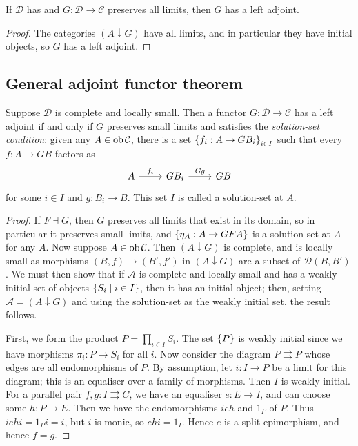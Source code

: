 \begin{proposition}
    If \( \mathcal D \) has and \( G : \mathcal D \to \mathcal C \) preserves all limits, then \( G \) has a left adjoint.
\end{proposition}
\begin{proof}
    The categories \( (A \downarrow G) \) have all limits, and in particular they have initial objects, so \( G \) has a left adjoint.
\end{proof}

\subsection{General adjoint functor theorem}
\begin{theorem}
    Suppose \( \mathcal D \) is complete and locally small.
    Then a functor \( G : \mathcal D \to \mathcal C \) has a left adjoint if and only if \( G \) preserves small limits and satisfies the \emph{solution-set condition}: given any \( A \in \operatorname{ob} \mathcal C \), there is a set \( \qty{f_i : A \to GB_i}_{i \in I} \) such that every \( f : A \to GB \) factors as
\[\begin{tikzcd}
	A & {GB_i} & GB
	\arrow["{f_i}", from=1-1, to=1-2]
	\arrow["Gg", from=1-2, to=1-3]
\end{tikzcd}\]
    for some \( i \in I \) and \( g : B_i \to B \).
    This set \( I \) is called a solution-set at \( A \).
\end{theorem}
\begin{proof}
    If \( F \dashv G \), then \( G \) preserves all limits that exist in its domain, so in particular it preserves small limits, and \( \qty{\eta_A : A \to GFA} \) is a solution-set at \( A \) for any \( A \).
    Now suppose \( A \in \operatorname{ob} \mathcal C \).
    Then \( (A \downarrow G) \) is complete, and is locally small as morphisms \( (B, f) \to (B', f') \) in \( (A \downarrow G) \) are a subset of \( \mathcal D(B, B') \).
    We must then show that if \( \mathcal A \) is complete and locally small and has a weakly initial set of objects \( \qty{S_i \mid i \in I} \), then it has an initial object; then, setting \( \mathcal A = (A \downarrow G) \) and using the solution-set as the weakly initial set, the result follows.

    First, we form the product \( P = \prod_{i \in I} S_i \).
    The set \( \qty{P} \) is weakly initial since we have morphisms \( \pi_i : P \to S_i \) for all \( i \).
    Now consider the diagram \( P \rightrightarrows P \) whose edges are all endomorphisms of \( P \).
    By assumption, let \( i : I \to P \) be a limit for this diagram; this is an equaliser over a family of morphisms.
    Then \( I \) is weakly initial.
    For a parallel pair \( f, g : I \rightrightarrows C \), we have an equaliser \( e : E \to I \), and can choose some \( h : P \to E \).
    Then we have the endomorphisms \( ieh \) and \( 1_P \) of \( P \).
    Thus \( iehi = 1_P i = i \), but \( i \) is monic, so \( ehi = 1_I \).
    Hence \( e \) is a split epimorphism, and hence \( f = g \).
\end{proof}
